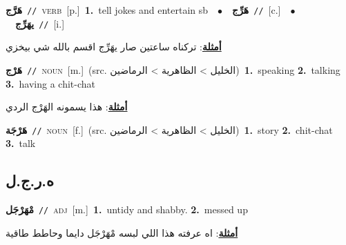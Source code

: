 \documentclass[10pt,a4paper,twoside]{article} %
\begin{document}
\begin{multicols}{2}
{\setlength\topsep{0pt}\textbf{\foreignlanguage{arabic}{هَرَّج}}\ {\color{gray}\texttt{//}\color{black}}\ \textsc{verb}\ [p.]\ \textbf{1.}~tell jokes and entertain sb\ \ $\bullet$\ \ \setlength\topsep{0pt}\textbf{\foreignlanguage{arabic}{هَرِّج}}\ {\color{gray}\texttt{//}\color{black}}\ [c.]\ \ $\bullet$\ \ \setlength\topsep{0pt}\textbf{\foreignlanguage{arabic}{يهَرِّج}}\ {\color{gray}\texttt{//}\color{black}}\ [i.]\  \begin{flushright}\color{gray}\foreignlanguage{arabic}{\textbf{\underline{\foreignlanguage{arabic}{أمثلة}}}: تركناه ساعتين صار يهَرِّج اقسم بالله شي بيخزي}\end{flushright}\color{black}} \vspace{2mm}

{\setlength\topsep{0pt}\textbf{\foreignlanguage{arabic}{هَرْج}}\ {\color{gray}\texttt{//}\color{black}}\ \textsc{noun}\ [m.]\ (src. \color{gray}\foreignlanguage{arabic}{الخليل > الظاهرية > الرماضين}\color{black})\ \textbf{1.}~speaking  \textbf{2.}~talking  \textbf{3.}~having a chit-chat\  \begin{flushright}\color{gray}\foreignlanguage{arabic}{\textbf{\underline{\foreignlanguage{arabic}{أمثلة}}}: هذا يسمونه الهَرْج الردي}\end{flushright}\color{black}} \vspace{2mm}

{\setlength\topsep{0pt}\textbf{\foreignlanguage{arabic}{هَرْجَة}}\ {\color{gray}\texttt{//}\color{black}}\ \textsc{noun}\ [f.]\ (src. \color{gray}\foreignlanguage{arabic}{الخليل > الظاهرية > الرماضين}\color{black})\ \textbf{1.}~story  \textbf{2.}~chit-chat  \textbf{3.}~talk\ } \vspace{2mm}

\vspace{-3mm}
\subsection*{\color{blue}\foreignlanguage{arabic}{ه.ر.ج.ل}\color{blue}{}} 

{\setlength\topsep{0pt}\textbf{\foreignlanguage{arabic}{مْهَرْجَل}}\ {\color{gray}\texttt{//}\color{black}}\ \textsc{adj}\ [m.]\ \textbf{1.}~untidy and shabby.  \textbf{2.}~messed up\  \begin{flushright}\color{gray}\foreignlanguage{arabic}{\textbf{\underline{\foreignlanguage{arabic}{أمثلة}}}: اه عرفته هذا اللي لبسه مْهَرْجَل دايما وحاطط طاقية}\end{flushright}\color{black}} \vspace{2mm}


\end{multicols}
\end{document}
